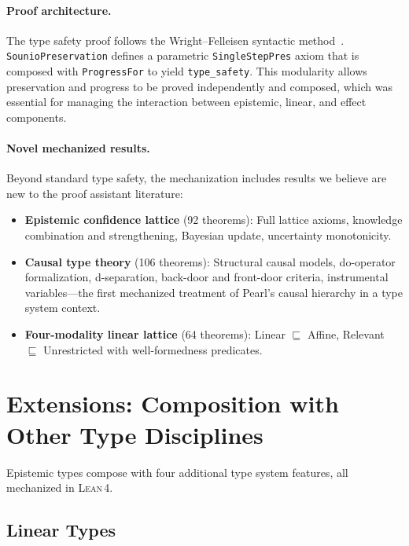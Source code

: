 \documentclass[acmsmall,screen,review,anonymous]{acmart}
\newcommand{\lean}{\textsc{Lean\,4}\xspace}
\begin{document}
\paragraph{Proof architecture.}
The type safety proof follows the Wright--Felleisen
syntactic method~\cite{wright1994type}.
\texttt{SounioPreservation} defines a parametric
\texttt{SingleStepPres} axiom that is composed with
\texttt{ProgressFor} to yield \texttt{type\_safety}.
This modularity allows preservation and progress to be proved
independently and composed, which was essential for managing
the interaction between epistemic, linear, and effect components.

\paragraph{Novel mechanized results.}
Beyond standard type safety, the mechanization includes results
we believe are new to the proof assistant literature:
\begin{itemize}
  \item \textbf{Epistemic confidence lattice} (92 theorems):
        Full lattice axioms, knowledge combination and strengthening,
        Bayesian update, uncertainty monotonicity.
  \item \textbf{Causal type theory} (106 theorems):
        Structural causal models, do-operator formalization,
        d-separation, back-door and front-door criteria,
        instrumental variables---the first mechanized treatment
        of Pearl's causal hierarchy in a type system context.
  \item \textbf{Four-modality linear lattice} (64 theorems):
        Linear $\sqsubseteq$ Affine, Relevant $\sqsubseteq$
        Unrestricted with well-formedness predicates.
\end{itemize}

\section{Extensions: Composition with Other Type Disciplines}
\label{sec:extensions}

Epistemic types compose with four additional type system features,
all mechanized in \lean.

\subsection{Linear Types}
\label{sec:linear}
\end{document}

